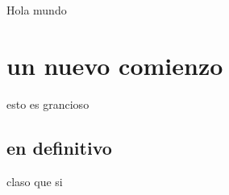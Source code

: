 \documentclass{article}
\begin{document}
Hola mundo

\section{un nuevo comienzo}

esto es grancioso

\subsection{en definitivo}

claso que si
\end{document}

